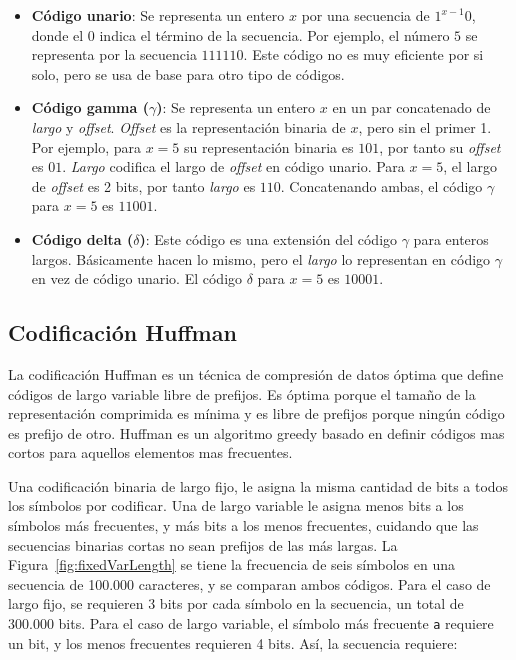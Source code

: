 \begin{itemize}
	\item \textbf{Código unario}: Se representa un entero $x$ por una secuencia de $1^{x-1}0$, donde el $0$ indica el término de la secuencia. Por ejemplo, el número $5$ se representa por la secuencia $111110$. Este código no es muy eficiente por si solo, pero se usa de base para otro tipo de códigos.
	
	\item \textbf{Código gamma ($\gamma$)}: Se representa un entero $x$ en un par concatenado de \textit{largo} y \textit{offset}. \textit{Offset} es la representación binaria de $x$, pero sin el primer 1. Por ejemplo, para $x=5$ su representación binaria es $101$, por tanto su \textit{offset} es $01$. \textit{Largo} codifica el largo de \textit{offset} en código unario. Para $x=5$, el largo de \textit{offset} es 2 bits, por tanto \textit{largo} es $110$. Concatenando ambas, el código $\gamma$ para $x=5$ es $11001$.
	
	\item \textbf{Código delta ($\delta$)}: Este código es una extensión del código $\gamma$ para enteros largos. Básicamente hacen lo mismo, pero el \textit{largo} lo representan en código $\gamma$ en vez de código unario. El código $\delta$ para $x=5$ es $10001$.
\end{itemize}

\subsection{Codificación Huffman}\label{sec:huffman}
La codificación Huffman\cite{huffman1952method} es un técnica de compresión de datos óptima que define códigos de largo variable libre de prefijos. Es óptima porque el tamaño de la representación comprimida es mínima y es libre de prefijos porque ningún código es prefijo de otro. Huffman es un algoritmo greedy basado en definir códigos mas cortos para aquellos elementos mas frecuentes. 

Una codificación binaria de largo fijo, le asigna la misma cantidad de bits a todos los símbolos por codificar. Una de largo variable le asigna menos bits a los símbolos más frecuentes, y más bits a los menos frecuentes, cuidando que las secuencias binarias cortas no sean prefijos de las más largas. La Figura~\ref{fig:fixedVarLength} se tiene la frecuencia de seis símbolos en una secuencia de 100.000 caracteres, y se comparan ambos códigos. Para el caso de largo fijo, se requieren 3 bits por cada símbolo en la secuencia, un total de 300.000 bits. Para el caso de largo variable, el símbolo más frecuente \texttt{a} requiere un bit, y los menos frecuentes requieren 4 bits. Así, la secuencia requiere:

